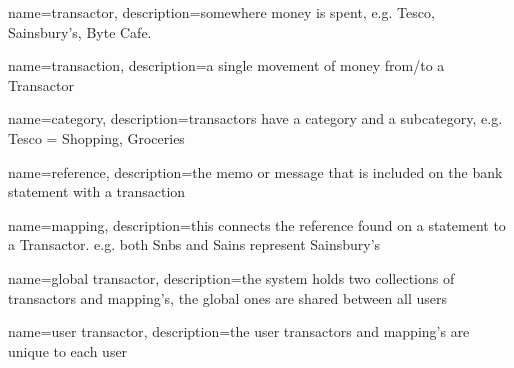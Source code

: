 {
  name={transactor},
  description={somewhere money is spent, e.g. Tesco, Sainsbury's, Byte Cafe.}
}

{
  name={transaction},
  description={a single movement of money from/to a Transactor}
}

{
  name={category},
  description={transactors have a category and a subcategory, e.g. Tesco = Shopping, Groceries}
}

{
  name={reference},
  description={the memo or message that is included on the bank statement with a transaction}
}

{
  name={mapping},
  description={this connects the reference found on a statement to a Transactor. e.g. both Snbs and Sains represent Sainsbury's}
}

{
  name={global transactor},
  description={the system holds two collections of transactors and mapping's, the global ones are shared between all users}
}

{
  name={user transactor},
  description={the user transactors and mapping's are unique to each user}
}